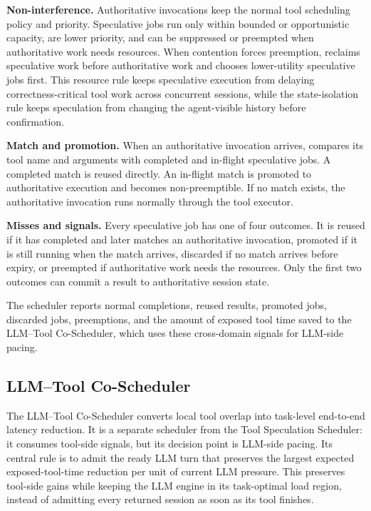 \noindent\textbf{Non-interference.}
Authoritative invocations keep the normal tool scheduling policy and priority.
Speculative jobs run only within bounded or opportunistic capacity, are lower priority, and can be suppressed or preempted when authoritative work needs resources.
When contention forces preemption, \sys reclaims speculative work before authoritative work and chooses lower-utility speculative jobs first.
This resource rule keeps speculative execution from delaying correctness-critical tool work across concurrent sessions, while the state-isolation rule keeps speculation from changing the agent-visible history before confirmation.

\noindent\textbf{Match and promotion.}
When an authoritative invocation arrives, \sys compares its tool name and arguments with completed and in-flight speculative jobs.
A completed match is reused directly.
An in-flight match is promoted to authoritative execution and becomes non-preemptible.
If no match exists, the authoritative invocation runs normally through the tool executor.

\noindent\textbf{Misses and signals.}
Every speculative job has one of four outcomes.
It is reused if it has completed and later matches an authoritative invocation, promoted if it is still running when the match arrives, discarded if no match arrives before expiry, or preempted if authoritative work needs the resources.
Only the first two outcomes can commit a result to authoritative session state.

The scheduler reports normal completions, reused results, promoted jobs, discarded jobs, preemptions, and the amount of exposed tool time saved to the LLM--Tool Co-Scheduler, which uses these cross-domain signals for LLM-side pacing.

\subsection{LLM--Tool Co-Scheduler}
\label{sec:design-llm-tool-coscheduler}

The LLM--Tool Co-Scheduler converts local tool overlap into task-level end-to-end latency reduction.
It is a separate scheduler from the Tool Speculation Scheduler: it consumes tool-side signals, but its decision point is LLM-side pacing.
Its central rule is to admit the ready LLM turn that preserves the largest expected exposed-tool-time reduction per unit of current LLM pressure.
This preserves tool-side gains while keeping the LLM engine in its task-optimal load region, instead of admitting every returned session as soon as its tool finishes.

